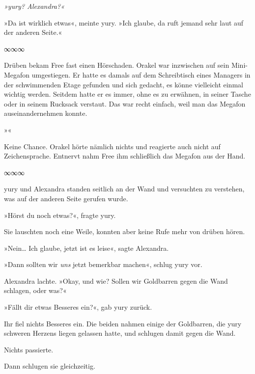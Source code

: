     \begin{footnotesize}

\textit{»yury? Alexandra?«}

    \end{footnotesize}

»Da ist wirklich etwas«, meinte yury. »Ich glaube, da ruft jemand sehr laut auf der anderen Seite.«

\begin{center}
    ∞∞∞
\end{center}

Drüben bekam Free fast einen Hörschaden. Orakel war inzwischen auf sein Mini-Megafon umgestiegen. Er hatte es damals auf dem Schreibtisch eines Managers in der schwimmenden Etage gefunden und sich gedacht, es könne vielleicht einmal wichtig werden. Seitdem hatte er es immer, ohne es zu erwähnen, in seiner Tasche oder in seinem Rucksack verstaut. Das war recht einfach, weil man das Megafon auseinandernehmen konnte.

»«

Keine Chance. Orakel hörte nämlich nichts und reagierte auch nicht auf Zeichensprache. Entnervt nahm Free ihm schließlich das Megafon aus der Hand.

\begin{center}
    ∞∞∞
\end{center}

yury und Alexandra standen seitlich an der Wand und versuchten zu verstehen, was auf der anderen Seite gerufen wurde.

»Hörst du noch etwas?«, fragte yury.

Sie lauschten noch eine Weile, konnten aber keine Rufe mehr von drüben hören.

»Nein… Ich glaube, jetzt ist es leise«, sagte Alexandra.

»Dann sollten wir \textit{uns} jetzt bemerkbar machen«, schlug yury vor.

Alexandra lachte. »Okay, und wie? Sollen wir Goldbarren gegen die Wand schlagen, oder was?«

»Fällt dir etwas Besseres ein?«, gab yury zurück.

Ihr fiel nichts Besseres ein. Die beiden nahmen einige der Goldbarren, die yury schweren Herzens liegen gelassen hatte, und schlugen damit gegen die Wand.

Nichts passierte.

Dann schlugen sie gleichzeitig.

